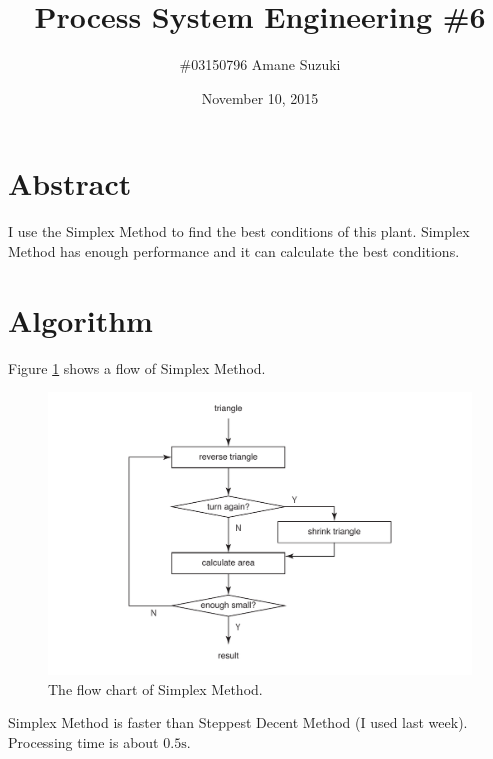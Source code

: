 \documentclass[a4paper,titlepage]{article}
\begin{document}
  \title{Process System Engineering \#6}
  \author{\#03150796 Amane Suzuki}
  \date{November 10, 2015}
  \maketitle

  \section{Abstract}
  I use the Simplex Method to find the best conditions of this plant.
  Simplex Method has enough performance and it can calculate the best conditions.

  \section{Algorithm}
  Figure \ref{fig:simplex} shows a flow of Simplex Method.

  \begin{figure}[htbp]
    \centering
    \includegraphics[width=12cm]{images/simplex.pdf}
    \caption{The flow chart of Simplex Method.}
    \label{fig:simplex}
  \end{figure}

  Simplex Method is faster than Steppest Decent Method (I used last week).
  Processing time is about $0.5 \si{\second}$.
\end{document}
